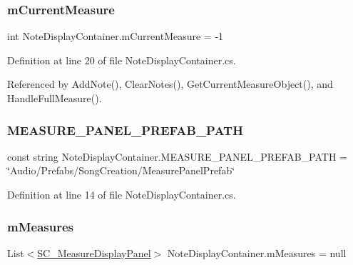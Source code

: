 \subsubsection{\texorpdfstring{m\+Current\+Measure}{mCurrentMeasure}}
{\footnotesize\ttfamily int Note\+Display\+Container.\+m\+Current\+Measure = -\/1\hspace{0.3cm}{\ttfamily [private]}}



Definition at line 20 of file Note\+Display\+Container.\+cs.



Referenced by Add\+Note(), Clear\+Notes(), Get\+Current\+Measure\+Object(), and Handle\+Full\+Measure().

\mbox{\label{class_note_display_container_a50e30949ce455a140c4c2a317ac0406e}} 
\subsubsection{\texorpdfstring{M\+E\+A\+S\+U\+R\+E\+\_\+\+P\+A\+N\+E\+L\+\_\+\+P\+R\+E\+F\+A\+B\+\_\+\+P\+A\+TH}{MEASURE\_PANEL\_PREFAB\_PATH}}
{\footnotesize\ttfamily const string Note\+Display\+Container.\+M\+E\+A\+S\+U\+R\+E\+\_\+\+P\+A\+N\+E\+L\+\_\+\+P\+R\+E\+F\+A\+B\+\_\+\+P\+A\+TH = \char`\"{}Audio/Prefabs/Song\+Creation/Measure\+Panel\+Prefab\char`\"{}\hspace{0.3cm}{\ttfamily [private]}}



Definition at line 14 of file Note\+Display\+Container.\+cs.

\mbox{\label{class_note_display_container_ae5ca6e7ea4ab2baaab9ff649bf25c0d6}} 
\subsubsection{\texorpdfstring{m\+Measures}{mMeasures}}
{\footnotesize\ttfamily List$<$\hyperlink{class_s_c___measure_display_panel}{S\+C\+\_\+\+Measure\+Display\+Panel}$>$ Note\+Display\+Container.\+m\+Measures = null\hspace{0.3cm}{\ttfamily [private]}}



